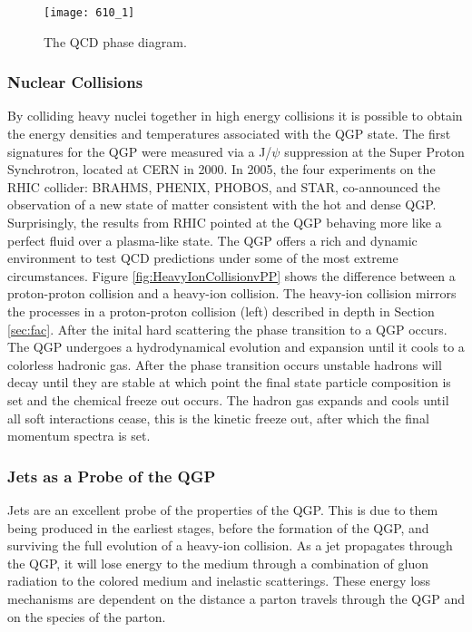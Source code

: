 \begin{figure}[h]
\texttt{[image: 610\_1]}
\centering
\caption{The QCD phase diagram\cite{Mohanty:2013yca}.}
\label{fig:QCDphase}
\end{figure}

\subsubsection{Nuclear Collisions}
By colliding heavy nuclei together in high energy collisions it is possible to obtain the energy densities and temperatures associated with the QGP state.  The first signatures for the QGP were measured via a J/$\psi$ suppression at the Super Proton Synchrotron, located at CERN in 2000\cite{Csorgo:2000yu}.  In 2005, the four experiments on the RHIC collider: BRAHMS\cite{Arsene:2004fa}, PHENIX\cite{Adcox2005184}, PHOBOS\cite{Back200528}, and STAR\cite{Adams2005102}, co-announced the observation of a new state of matter consistent with the hot and dense QGP.  Surprisingly, the results from RHIC pointed at the QGP behaving more like a perfect fluid over a plasma-like state\cite{Jacak310}.  The QGP offers a rich and dynamic environment to test QCD predictions under some of the most extreme circumstances.  
Figure \ref{fig:HeavyIonCollisionvPP} shows the difference between a proton-proton collision and a heavy-ion collision.  The heavy-ion collision mirrors the processes in a proton-proton collision (left) described in depth in Section \ref{sec:fac}.  After the inital hard scattering the phase transition to a QGP occurs.  The QGP undergoes a hydrodynamical evolution and expansion until it cools to a colorless hadronic gas.  After the phase transition occurs unstable hadrons will decay until they are stable at which point the final state particle composition is set and the chemical freeze out occurs. The hadron gas expands and cools until all soft interactions cease, this is the kinetic freeze out, after which the final momentum spectra is set.  

\subsubsection{Jets as a Probe of the QGP}

Jets are an excellent probe of the properties of the QGP.  This is due to them being produced in the earliest stages, before the formation of the QGP, and surviving the full evolution of a heavy-ion collision.  As a jet propagates through the QGP, it will lose energy to the medium through a combination of gluon radiation to the colored medium and inelastic scatterings.  These energy loss mechanisms are dependent on the distance a parton travels through the QGP and on the species of the parton.  


